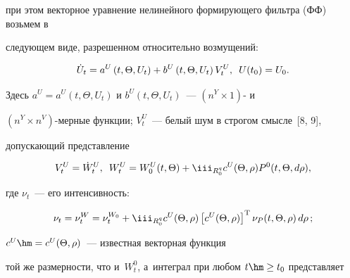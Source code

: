 при этом векторное уравнение нелинейного формирующего фильтра (ФФ) возьмем в 

следующем виде, разрешенном относительно возмущений:

  \begin{equation}

  \dot U_t = a^U \left(t, \Theta,U_t\right)  + b^U \left(t, \Theta,U_t\right) V_t^U, \enskip 

U(t_0) = U_0.\label{e3.2-s}

\end{equation}

Здесь $a^U = a^U(t, \Theta,U_t)$ и $b^U(t, \Theta,U_t)$~--- $(n^Y\times 1)$- и 

$(n^Y\times n^V)$-мер\-ные функции; $V_t^U$~--- белый шум в строгом смысле~[8, 9], 

допускающий представление

\begin{equation}

V_t^U = \dot W_t^U, \enskip W_t^U = W_0^U (t,\Theta) + \iii_{R_0^q} c^U 

(\Theta,\rho) P^0 ( t,\Theta, d\rho),\label{e3.3-s}

\end{equation}



\noindent

где $\nu_t$~--- его интенсивность:



\vspace*{2pt}



\noindent

   \begin{equation}

   \nu_t=\nu_t^W =\nu_t^{W_0} +  \iii_{R_0^q} c^U (\Theta,\rho) \left[c^U 

(\Theta,\rho)\right]^{\mathrm{T}} \nu_P (t,\Theta,\rho) \,d\rho\,;

\label{e3.4-s}

\end{equation}



\vspace*{-2pt}



\noindent

 $c^U \hm= c^U(\Theta,\rho)$~--- известная векторная функция 

той же размерности, что и~$W_t^0$, а~интеграл при любом $t\hm\ge t_0$ представляет 

